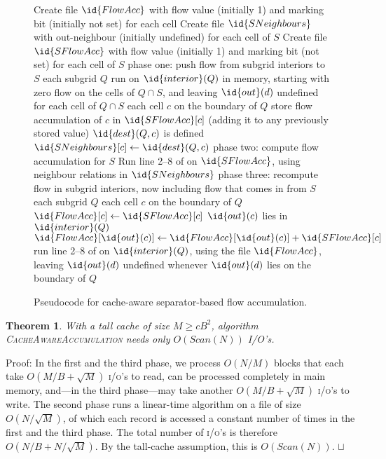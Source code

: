 \documentclass[10pt,a4paper]{article}
\newtheorem{theorem}{Theorem}
\newenvironment{proof}{Proof:}{\qed}
\def\squareforqed{\hbox{\rlap{$\sqcap$}$\sqcup$}}
\def\qed{\ifmmode\squareforqed\else{\unskip\nobreak\hfil
\penalty50\hskip1em\null\nobreak\hfil\squareforqed
\parfillskip=0pt\finalhyphendemerits=0\endgraf}\fi}
\def\ios{\textsc{i/o}'s\xspace}
\def\scan{\mathit{Scan}}
\begin{document}
\begin{figure}
\begin{codebox}
\li Create file $\id{FlowAcc}$ with flow value (initially 1) and marking bit (initially not set) for each cell
\li Create file $\id{SNeighbours}$ with out-neighbour (initially undefined) for each cell of $S$
\li Create file $\id{SFlowAcc}$ with flow value (initially 1) and marking bit (not set) for each cell of $S$
\li \Comment phase one: push flow from subgrid interiors to $S$
\li \For each subgrid $Q$
\li \Do  run  on $\id{interior}(Q)$ in memory,
\li      \hbox{}\quad\quad\quad\quad\quad\quad starting with zero flow on the cells of $Q \cap S$, and
\li      \hbox{}\quad\quad\quad\quad\quad\quad leaving $\id{out}(d)$ undefined for each cell of $Q \cap S$
\li      \For each cell $c$ on the boundary of $Q$
\li      \Do  store flow accumulation of $c$ in $\id{SFlowAcc}[c]$
\li           \hbox{}\quad\quad\quad\quad\quad\quad (adding it to any previously stored value)
\li           \If $\id{dest}(Q,c)$ is defined
\li           \Then $\id{SNeighbours}[c] \gets \id{dest}(Q,c)$
              \End
         \End
    \End
\li \Comment phase two: compute flow accumulation for $S$
\li Run line 2--8 of  on $\id{SFlowAcc}$, using neighbour relations in $\id{SNeighbours}$
\li \Comment phase three: recompute flow in subgrid interiors, now including flow that comes in from $S$
\li \For each subgrid $Q$
\li \Do  \For each cell $c$ on the boundary of $Q$
\li      \Do $\id{FlowAcc}[c] \gets \id{SFlowAcc}[c]$
\li          \If $\id{out}(c)$ lies in $\id{interior}(Q)$
\li          \Then $\id{FlowAcc}[\id{out}(c)] \gets \id{FlowAcc}[\id{out}(c)] + \id{SFlowAcc}[c]$
             \End
         \End
\li      run line 2--8 of  on $\id{interior}(Q)$, using the file $\id{FlowAcc}$,
\li      \hbox{}\quad\quad\quad\quad\quad\quad leaving $\id{out}(d)$ undefined whenever $\id{out}(d)$ lies on the boundary of $Q$
    \End
\end{codebox}
\caption{Pseudocode for cache-aware separator-based flow accumulation.}
\label{fig:cacheawarecode}
\end{figure}

\begin{theorem}\label{CacheAwareAccumulation}
With a tall cache of size $M \geq c B^2$, algorithm \textsc{CacheAwareAccumulation} needs only $O(\scan(N))$ I/O's.
\end{theorem}
\begin{proof}
In the first and the third phase, we process $O(N/M)$ blocks that each take $O(M/B + \sqrt M)$ \ios to read, can be processed completely in main memory, and---in the third phase---may take another $O(M/B + \sqrt M)$ \ios to write. The second phase runs a linear-time algorithm on a file of size $O(N/\sqrt M)$, of which each record is accessed a constant number of times in the first and the third phase. The total number of \ios is therefore $O(N/B + N/\sqrt M)$. By the tall-cache assumption, this is $O(\scan(N))$.
\end{proof}
\end{document}
